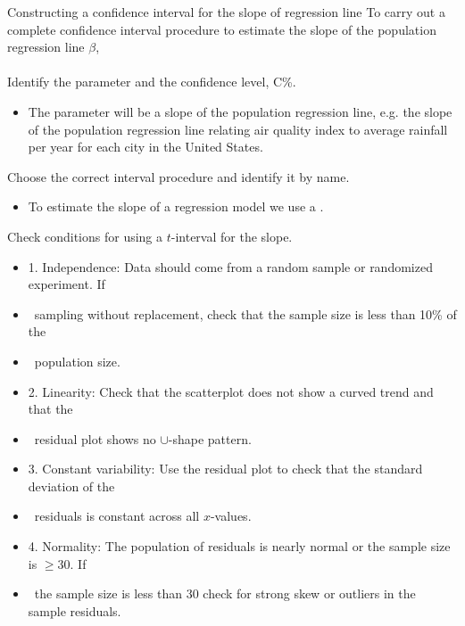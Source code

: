 \begin{onebox}{Constructing a confidence interval for the slope of regression line}
To carry out a complete confidence interval procedure to estimate the slope of the population regression line $\beta$,
\\
\\
 Identify the parameter and the confidence level, C\%.\vspace{-1mm}
\begin{itemize} 
\item[] The parameter will be a slope of the population regression line, e.g. the slope of the population regression line relating air quality index to average rainfall per year for each city in the United States.  
\end{itemize}
 Choose the correct interval procedure and identify it by name. \vspace{-1mm}
\begin{itemize}
\item[] To estimate the slope of a regression model we use a .
\end{itemize}
 Check conditions for using a $t$-interval for the slope.\vspace{-1mm}
\begin{itemize}
\setlength{\itemsep}{0mm}
\item[]  1. Independence:  Data should come from a random sample or randomized experiment.  If 
\item[] \ \quad sampling without replacement, check that the sample size is less than 10\% of the 
\item[] \ \quad population size.
\item[] 2.  Linearity:  Check that the scatterplot does not show a curved trend and that the 
\item[] \ \quad residual plot shows no $\cup$-shape pattern.  
\item[] 3.  Constant variability:  Use the residual plot to check that the standard deviation of the 
\item[] \ \quad residuals is constant across all $x$-values.
\item[] 4. Normality:  The population of residuals is nearly normal or the sample size is $\ge 30$.  If 
\item[] \ \quad the sample size is less than 30 check for strong skew or outliers in the sample residuals.  

\end{itemize}
\end{onebox}
